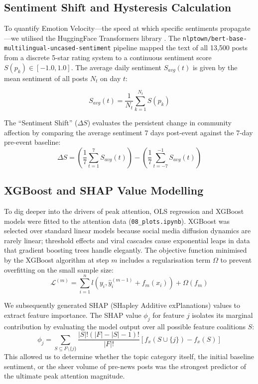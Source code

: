 \documentclass[9pt,twoside,lineno]{pnas-new}
\begin{document}
\begin{article}
\subsection*{Sentiment Shift and Hysteresis Calculation}
To quantify Emotion Velocity---the speed at which specific sentiments propagate---we utilised the HuggingFace Transformers library \cite{wolf2019huggingface}. The \texttt{nlptown/bert-base-multilingual-uncased-sentiment} pipeline mapped the text of all 13,500 posts from a discrete 5-star rating system to a continuous sentiment score $S(p_k) \in [-1.0, 1.0]$. The average daily sentiment $S_{avg}(t)$ is given by the mean sentiment of all posts $N_t$ on day $t$:

\begin{equation}
S_{avg}(t) = \frac{1}{N_t} \sum_{k=1}^{N_t} S(p_k)
\end{equation}

The ``Sentiment Shift'' ($\Delta S$) evaluates the persistent change in community affection by comparing the average sentiment 7 days post-event against the 7-day pre-event baseline:
\begin{equation}
\Delta S = \left( \frac{1}{7} \sum_{t=1}^{7} S_{avg}(t) \right) - \left( \frac{1}{7} \sum_{t=-7}^{-1} S_{avg}(t) \right)
\end{equation}

\subsection*{XGBoost and SHAP Value Modelling}
To dig deeper into the drivers of peak attention, OLS regression and XGBoost models were fitted to the attention data (\texttt{08\_plots.ipynb}). XGBoost was selected over standard linear models because social media diffusion dynamics are rarely linear; threshold effects and viral cascades cause exponential leaps in data that gradient boosting trees handle elegantly. The objective function minimised by the XGBoost algorithm at step $m$ includes a regularisation term $\Omega$ to prevent overfitting on the small sample size:
\begin{equation}
\mathcal{L}^{(m)} = \sum_{i=1}^{n} l\left(y_i, \hat{y}_i^{(m-1)} + f_m(x_i)\right) + \Omega(f_m)
\end{equation}

We subsequently generated SHAP (SHapley Additive exPlanations) values to extract feature importance. The SHAP value $\phi_j$ for feature $j$ isolates its marginal contribution by evaluating the model output over all possible feature coalitions $S$:
\begin{equation}
\phi_j = \sum_{S \subseteq F \setminus \{j\}} \frac{|S|! (|F| - |S| - 1)!}{|F|!} \left[ f_x(S \cup \{j\}) - f_x(S) \right]
\end{equation}
This allowed us to determine whether the topic category itself, the initial baseline sentiment, or the sheer volume of pre-news posts was the strongest predictor of the ultimate peak attention magnitude.


\end{article}
\end{document}
